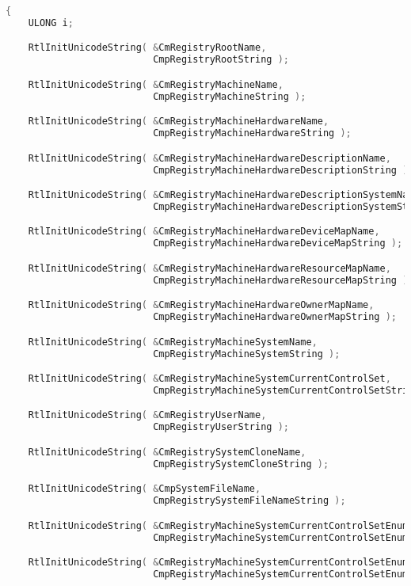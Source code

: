 \begin{lstlisting}[language=C, basicstyle=\tiny]
  {
    ULONG i;

    RtlInitUnicodeString( &CmRegistryRootName,
                          CmpRegistryRootString );

    RtlInitUnicodeString( &CmRegistryMachineName,
                          CmpRegistryMachineString );

    RtlInitUnicodeString( &CmRegistryMachineHardwareName,
                          CmpRegistryMachineHardwareString );

    RtlInitUnicodeString( &CmRegistryMachineHardwareDescriptionName,
                          CmpRegistryMachineHardwareDescriptionString );

    RtlInitUnicodeString( &CmRegistryMachineHardwareDescriptionSystemName,
                          CmpRegistryMachineHardwareDescriptionSystemString );

    RtlInitUnicodeString( &CmRegistryMachineHardwareDeviceMapName,
                          CmpRegistryMachineHardwareDeviceMapString );

    RtlInitUnicodeString( &CmRegistryMachineHardwareResourceMapName,
                          CmpRegistryMachineHardwareResourceMapString );

    RtlInitUnicodeString( &CmRegistryMachineHardwareOwnerMapName,
                          CmpRegistryMachineHardwareOwnerMapString );

    RtlInitUnicodeString( &CmRegistryMachineSystemName,
                          CmpRegistryMachineSystemString );

    RtlInitUnicodeString( &CmRegistryMachineSystemCurrentControlSet,
                          CmpRegistryMachineSystemCurrentControlSetString);

    RtlInitUnicodeString( &CmRegistryUserName,
                          CmpRegistryUserString );

    RtlInitUnicodeString( &CmRegistrySystemCloneName,
                          CmpRegistrySystemCloneString );

    RtlInitUnicodeString( &CmpSystemFileName,
                          CmpRegistrySystemFileNameString );

    RtlInitUnicodeString( &CmRegistryMachineSystemCurrentControlSetEnumName,
                          CmpRegistryMachineSystemCurrentControlSetEnumString);

    RtlInitUnicodeString( &CmRegistryMachineSystemCurrentControlSetEnumRootName,
                          CmpRegistryMachineSystemCurrentControlSetEnumRootString);


\end{lstlisting}
